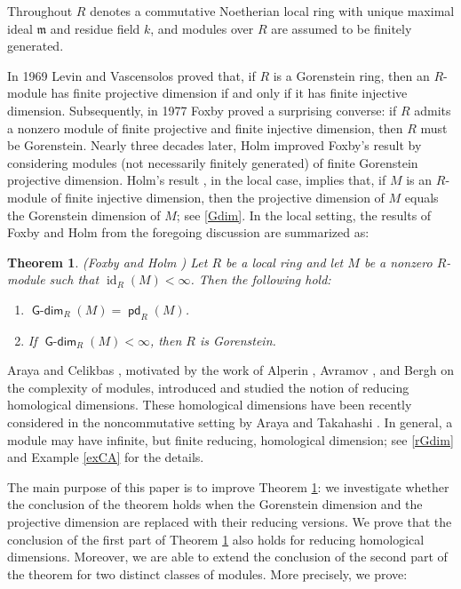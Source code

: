 \documentclass{amsart}
\theoremstyle{plain} %
\newtheorem{thm}{Theorem}[section]
\theoremstyle{definition}
\newcommand{\fm}{\mathfrak{m}}
\DeclareMathOperator{\id}{id}
\def\pd{\operatorname{\mathsf{pd}}}
\DeclareMathOperator{\Gdim}{\mathsf{G-dim}}
\begin{document}
Throughout $R$ denotes a commutative Noetherian local ring with unique maximal ideal $\fm$ and residue field $k$, and modules over $R$ are assumed to be finitely generated.

In 1969 Levin and Vascensolos \cite[2.2]{LV} proved that, if $R$ is a Gorenstein ring, then an $R$-module has finite projective dimension if and only if it has finite injective dimension. Subsequently, in 1977 Foxby \cite[4.4]{Foxby77} proved a surprising converse: if $R$ admits a nonzero module of finite projective and finite injective dimension, then $R$ must be Gorenstein. Nearly three decades later, Holm \cite[2.2]{Holm} improved Foxby's result by considering modules (not necessarily finitely generated) of finite Gorenstein projective dimension. Holm's result \cite{Holm}, in the local case, implies that, if $M$ is an $R$-module of finite injective dimension, then the projective dimension of $M$ equals the Gorenstein dimension of $M$; see \ref{Gdim}. In the local setting, the results of Foxby and Holm from the foregoing discussion are summarized as: 

\begin{thm} \label{Holm} (Foxby \cite[4.4]{Foxby77} and Holm \cite[2.2]{Holm}) Let $R$ be a local ring and let $M$ be a nonzero $R$-module such that $\id_R(M)<\infty$. Then the following hold:
\begin{enumerate}[\rm(i)]
\item $\Gdim_R(M)=\pd_R(M)$. 
\item If $\Gdim_R(M)<\infty$, then $R$ is Gorenstein.
\end{enumerate}
\end{thm}

Araya and Celikbas \cite{CA}, motivated by the work of Alperin \cite{Alp}, Avramov \cite{Av1}, and Bergh \cite{Be, Berghredcx2} on the complexity of modules, introduced and studied the notion of reducing homological dimensions. These homological dimensions have been recently considered in the noncommutative setting by Araya and Takahashi \cite{AT}. In general, a module may have infinite, but finite reducing, homological dimension; see \ref{rGdim} and Example \ref{exCA} for the details.

The main purpose of this paper is to improve Theorem \ref{Holm}: we investigate whether the conclusion of the theorem holds when the Gorenstein dimension and the projective dimension are replaced with their reducing versions. We prove that the conclusion of the first part of Theorem \ref{Holm} also holds for reducing homological dimensions. Moreover, we are able to extend the conclusion of the second part of the theorem for two distinct classes of modules. More precisely, we prove:
\end{document}
